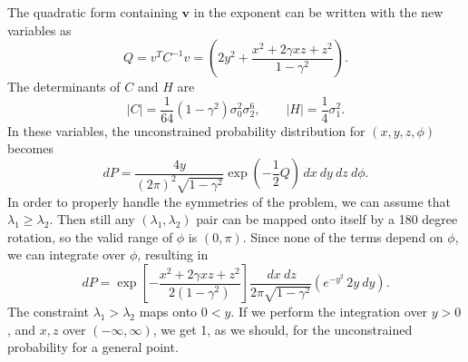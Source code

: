 \documentclass[twocolumn]{emulateapj}
\newcommand{\vv}{\mathbf{v}}
\begin{document}
The quadratic form containing $\vv$ in the exponent can be written with the new 
variables as
\begin{equation}
	Q = v^T C^{-1} v = \left(
		2 y^2	+\frac{x^2 + 2\gamma x z + z^2}{1-\gamma^2}\right).
\end{equation}
The determinants of $C$ and $H$ are 
\begin{equation}
	|C| = \frac{1}{64}(1-\gamma^2)\sigma_0^2\sigma_2^6,\qquad
	|H| = \frac{1}{4} \sigma_1^2.
\end{equation}
In these variables, the unconstrained probability distribution for 
$(x,y,z,\phi)$ becomes
\begin{equation}
	dP = \frac{4y}{(2\pi)^2 \sqrt{1-\gamma^2}} \exp(-\frac{1}{2}Q) 
		\,dx\ dy\ dz\ d\phi.
\end{equation}
In order to properly handle the symmetries of the problem, we can assume that 
$\lambda_1\geq\lambda_2$. Then still any $(\lambda_1,\lambda_2)$ pair can be 
mapped onto itself by a 180 degree rotation, so the valid range of $\phi$ is 
$(0,\pi)$.  Since none of the terms depend on $\phi$, we can integrate 
over $\phi$, resulting in
\begin{equation}
	dP =  
		 \exp\left[-\frac{x^2 + 2\gamma x z + z^2}{2(1-\gamma^2)}\right] 
			\frac{\,dx\ dz}{2\pi \sqrt{1-\gamma^2}}
		\left( e^{-y^2}\,2y\ dy\right).
\end{equation}
The constraint $\lambda_1>\lambda_2$ maps onto $0<y$. If we perform the 
integration over $y>0$, and $x,z$ over $(-\infty,\infty)$, we get 1, as we 
should, for the unconstrained probability for a general point.
\end{document}
